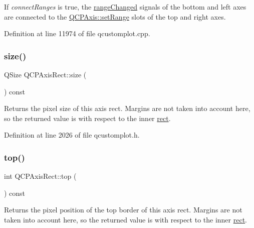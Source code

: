 If {\itshape connect\+Ranges} is true, the \hyperlink{class_q_c_p_axis_a0894084e4c16a1736534c4095746f910}{range\+Changed} signals of the bottom and left axes are connected to the \hyperlink{class_q_c_p_axis_aebdfea5d44c3a0ad2b4700cd4d25b641}{Q\+C\+P\+Axis\+::set\+Range} slots of the top and right axes. 

Definition at line 11974 of file qcustomplot.\+cpp.

\mbox{\label{class_q_c_p_axis_rect_a7a8289346eb612f422c704f8b75cf479}} 
\subsubsection{\texorpdfstring{size()}{size()}}
{\footnotesize\ttfamily Q\+Size Q\+C\+P\+Axis\+Rect\+::size (\begin{DoxyParamCaption}{ }\end{DoxyParamCaption}) const\hspace{0.3cm}{\ttfamily [inline]}}

Returns the pixel size of this axis rect. Margins are not taken into account here, so the returned value is with respect to the inner \hyperlink{class_q_c_p_layout_element_a208effccfe2cca4a0eaf9393e60f2dd4}{rect}. 

Definition at line 2026 of file qcustomplot.\+h.

\mbox{\label{class_q_c_p_axis_rect_a45dbad181cbb9f09d068dbb76c817c95}} 
\subsubsection{\texorpdfstring{top()}{top()}}
{\footnotesize\ttfamily int Q\+C\+P\+Axis\+Rect\+::top (\begin{DoxyParamCaption}{ }\end{DoxyParamCaption}) const\hspace{0.3cm}{\ttfamily [inline]}}

Returns the pixel position of the top border of this axis rect. Margins are not taken into account here, so the returned value is with respect to the inner \hyperlink{class_q_c_p_layout_element_a208effccfe2cca4a0eaf9393e60f2dd4}{rect}. 

